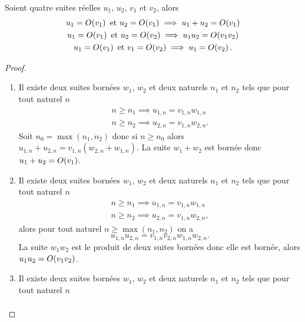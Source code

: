 \begin{prop}
    Soient quatre suites réelles \(u_1\), \(u_2\), \(v_1\) et \(v_2\), alors
    \begin{gather}
        u_1 = O\mathopen{}\left(v_1\right) \text{~et~} u_2 = O\mathopen{}\left(v_1\right) \implies u_1+u_2 = 
        O\mathopen{}\left(v_1\right)\\
        u_1 = O\mathopen{}\left(v_1\right) \text{~et~} u_2 = O\mathopen{}\left(v_2\right) \implies u_1u_2 = 
        O\mathopen{}\left(v_1 v_2\right)\\
        u_1 = O\mathopen{}\left(v_1\right) \text{~et~} v_1 = O\mathopen{}\left(v_2\right) \implies u_1 = 
        O\mathopen{}\left(v_2\right).
    \end{gather}
\end{prop}
\begin{proof}
    \begin{enumerate}
        \item Il existe deux suites bornées \(w_1\), \(w_2\) et deux naturels 
            \(n_1\) et \(n_2\) tels que pour tout naturel \(n\)
            \begin{align}
                n \geqslant n_1 \implies u_{1,n} = v_{1,n}w_{1,n} \\
                n \geqslant n_2 \implies u_{2,n} = v_{1,n}w_{2,n}.
            \end{align}
            Soit \(n_0 = \max(n_1,n_2)\) donc si \(n \geqslant n_0\) alors \(u_{1,n} + 
            u_{2,n}= v_{1,n} (w_{2,n}+w_{1,n})\). La suite \(w_{1} + w_{2}\) est 
            bornée donc \(u_1+u_2 = O\mathopen{}\left(v_1\right)\).
        \item Il existe deux suites bornées \(w_1\), \(w_2\) et deux naturels 
            \(n_1\) et \(n_2\) tels que pour tout naturel \(n\)
            \begin{align}
                n \geqslant n_1 \implies u_{1,n} = v_{1,n}w_{1,n} \\
                n \geqslant n_2 \implies u_{2,n} = v_{1,n}w_{2,n},
            \end{align}
            alors pour tout naturel \(n \geqslant \max(n_1,n_2)\) on a
            \begin{equation}
                u_{1,n} u_{2,n} = v_{1,n} v_{2,n} w_{1,n} w_{2,n}.
            \end{equation}
            La suite \(w_1 w_2\) est le produit de deux suites bornées donc elle est 
            bornée, alors \(u_1u_2 = O\mathopen{}\left(v_1v_2\right)\).
        \item Il existe deux suites bornées \(w_1\), \(w_2\) et deux naturels 
            \(n_1\) et \(n_2\) tels que pour tout naturel \(n\) \begin{align}

\end{align}
\end{enumerate}
\end{proof}
